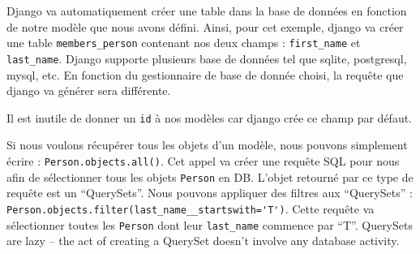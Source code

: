\documentclass[11pt, a4paper]{article}   	%
\begin{document}
Django va automatiquement créer une table dans la base de données en fonction de notre modèle que nous avons défini.
Ainsi, pour cet exemple, django va créer une table \texttt{members\_person} contenant nos deux champs : \texttt{first\_name} et \texttt{last\_name}.
Django supporte plusieurs base de données tel que sqlite, postgresql, mysql, etc.
En fonction du gestionnaire de base de donnée choisi, la requête que django va générer sera différente. 

Il est inutile de donner un \texttt{id} à nos modèles car django crée ce champ par défaut.

Si nous voulons récupérer tous les objets d'un modèle, nous pouvons simplement écrire : \lstinline{Person.objects.all()}.
Cet appel va créer une requête SQL pour nous afin de sélectionner tous les objets \texttt{Person} en DB.
L'objet retourné par ce type de requête est un \enquote{QuerySets}.
Nous pouvons appliquer des filtres aux \enquote{QuerySets} : \lstinline{Person.objects.filter(last_name__startswith='T')}.
Cette requête va sélectionner toutes les \texttt{Person} dont leur \texttt{last\_name} commence par \enquote{T}.
QuerySets are lazy – the act of creating a QuerySet doesn’t involve any database activity.
\end{document}
